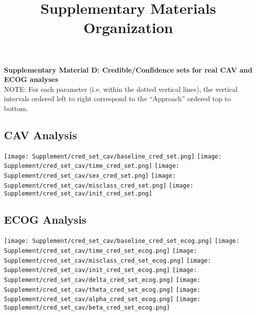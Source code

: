 \documentclass{article}
\title{Supplementary Materials Organization}
\date{\vspace{-5ex}}
\begin{document}
\noindent \textbf{\LARGE Supplementary Material D: Credible/Confidence sets for real CAV and ECOG analyses}\\
NOTE: For each parameter (i.e. within the dotted vertical lines), the vertical intervals ordered left to right correspond to the ``Approach'' ordered top to bottom.
\subsection*{CAV Analysis}
\begin{center}
    \texttt{[image: Supplement/cred\_set\_cav/baseline\_cred\_set.png]}
    \texttt{[image: Supplement/cred\_set\_cav/time\_cred\_set.png]}
    \texttt{[image: Supplement/cred\_set\_cav/sex\_cred\_set.png]}
    \texttt{[image: Supplement/cred\_set\_cav/misclass\_cred\_set.png]}
    \texttt{[image: Supplement/cred\_set\_cav/init\_cred\_set.png]}
\end{center}


\subsection*{ECOG Analysis}
\begin{center}
    \texttt{[image: Supplement/cred\_set\_cav/baseline\_cred\_set\_ecog.png]}
    \texttt{[image: Supplement/cred\_set\_cav/time\_cred\_set\_ecog.png]}
    \texttt{[image: Supplement/cred\_set\_cav/misclass\_cred\_set\_ecog.png]}
    \texttt{[image: Supplement/cred\_set\_cav/init\_cred\_set\_ecog.png]}
    \texttt{[image: Supplement/cred\_set\_cav/delta\_cred\_set\_ecog.png]}
    \texttt{[image: Supplement/cred\_set\_cav/theta\_cred\_set\_ecog.png]}
    \texttt{[image: Supplement/cred\_set\_cav/alpha\_cred\_set\_ecog.png]}
    \texttt{[image: Supplement/cred\_set\_cav/beta\_cred\_set\_ecog.png]}
\end{center}
\end{document}
